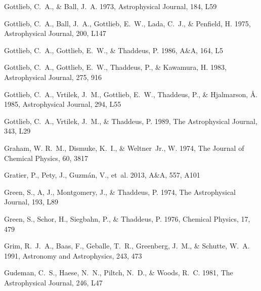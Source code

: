\documentclass[twocolumn]{aastex631}
\begin{document}
\begin{thebibliography}{}
Gottlieb, C.~A., \& Ball, J.~A. 1973, Astrophysical Journal, 184, L59

Gottlieb, C.~A., Ball, J.~A., Gottlieb, E.~W., Lada, C.~J., \& Penfield, H.
  1975, Astrophysical Journal, 200, L147

Gottlieb, C.~A., Gottlieb, E.~W., \& Thaddeus, P. 1986, A{\&}A, 164, L5

Gottlieb, C.~A., Gottlieb, E.~W., Thaddeus, P., \& Kawamura, H. 1983,
  Astrophysical Journal, 275, 916

Gottlieb, C.~A., Vrtilek, J.~M., Gottlieb, E.~W., Thaddeus, P., \& Hjalmarson,
  {\AA}. 1985, Astrophysical Journal, 294, L55

Gottlieb, C.~A., Vrtilek, J.~M., \& Thaddeus, P. 1989, The Astrophysical
  Journal, 343, L29

Graham, W. R.~M., Dismuke, K.~I., \& Weltner~Jr., W. 1974, The Journal of
  Chemical Physics, 60, 3817

Gratier, P., Pety, J., Guzm{\'a}n, V., {et~al.} 2013, A{\&}A, 557, A101

Green, S., A, J., Montgomery, J., \& Thaddeus, P. 1974, The Astrophysical
  Journal, 193, L89

Green, S., Schor, H., Siegbahn, P., \& Thaddeus, P. 1976, Chemical Physics, 17,
  479

{Grim}, R.~J.~A., {Baas}, F., {Geballe}, T.~R., {Greenberg}, J.~M., \&
  {Schutte}, W.~A. 1991, Astronomy and Astrophysics, 243, 473

Gudeman, C.~S., Haese, N.~N., Piltch, N.~D., \& Woods, R.~C. 1981, The
  Astrophysical Journal, 246, L47


\end{thebibliography}
\end{document}
